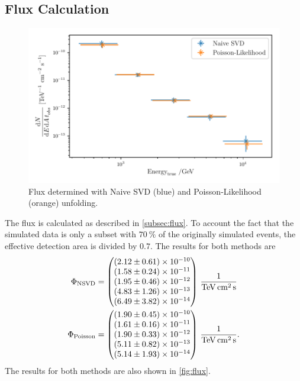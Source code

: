 \subsection{Flux Calculation}

\begin{figure}[tb]
  \centering
  \includegraphics[width=.7\textwidth]{plots/flux.pdf}
  \caption{Flux determined with Naive SVD (blue) and Poisson-Likelihood (orange) unfolding.}
  \label{fig:flux}
\end{figure}

The flux is calculated as described in \autoref{subsec:flux}. To account the fact that the simulated data is only a subset with $\SI{70}{\percent}$ of the originally simulated events, the effective detection area is divided by $\num{0.7}$.
The results for both methods are
\begin{align}
  \Phi_\mathrm{NSVD} &= \begin{pmatrix} \num{2.12 \pm .61e-10} \\ \num{1.58 \pm .24e-11} \\ \num{1.95 \pm .46e-12} \\ \num{4.83 \pm 1.26e-13} \\ \num{6.49 \pm 3.82e-14} \end{pmatrix}\,\si{\per\tera\eV\per\cm\squared\per\second} \\
  \Phi_\mathrm{Poisson} &= \begin{pmatrix} \num{1.90 \pm .45e-10} \\ \num{1.61 \pm .16e-11} \\ \num{1.90 \pm .33e-12} \\ \num{5.11 \pm .82e-13} \\ \num{5.14 \pm 1.93e-14} \end{pmatrix}\,\si{\per\tera\eV\per\cm\squared\per\second}.
\end{align}
The results for both methods are also shown in \autoref{fig:flux}.


